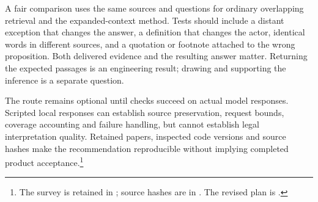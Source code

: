 A fair comparison uses the same sources and questions for ordinary overlapping
retrieval and the expanded-context method. Tests should include a distant
exception that changes the answer, a definition that changes the actor,
identical words in different sources, and a quotation or footnote attached to
the wrong proposition. Both delivered evidence and the resulting answer
matter. Returning the expected passages is an engineering result; drawing
and supporting the inference is a separate question.

The route remains optional until checks succeed on actual model responses.
Scripted local responses can establish source preservation, request bounds,
coverage accounting and failure handling, but cannot establish legal
interpretation quality. Retained papers, inspected code versions and source
hashes make the recommendation reproducible without implying completed
product acceptance.\footnote{The survey is retained in
;
source hashes are in
.
The revised plan is
.}

